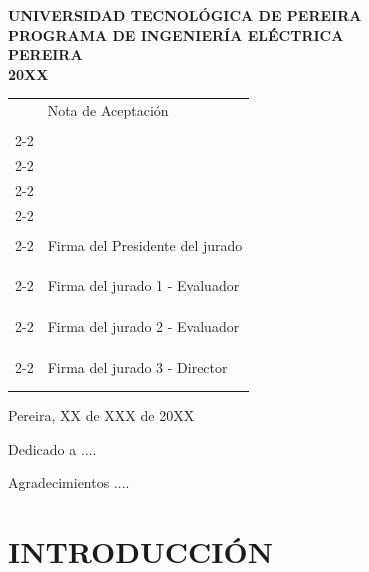 \documentclass[12pt,twoside]{article}
\providecommand{\tabularnewline}{\\}
\let\stdsection\section
\renewcommand\section{\cleardoublepage\stdsection}
\begin{document}
\noindent \begin{center}
\textbf{UNIVERSIDAD TECNOLÓGICA DE PEREIRA\\PROGRAMA DE INGENIERÍA
ELÉCTRICA\\PEREIRA\\20XX}
\par\end{center}

\noindent \begin{center}
\cleardoublepage{}
\par\end{center}

\noindent \begin{flushright}
\begin{tabular}{c>{\centering}p{}}
 & Nota de Aceptación\tabularnewline
 & \tabularnewline
\cline{2-2} 
 & \tabularnewline
\cline{2-2} 
 & \tabularnewline
\cline{2-2} 
 & \tabularnewline
\cline{2-2} 
 & \tabularnewline
 & \tabularnewline
\cline{2-2} 
 & Firma del Presidente del jurado\tabularnewline
 & \tabularnewline
 & \tabularnewline
 & \tabularnewline
\cline{2-2} 
 & Firma del jurado 1 - Evaluador\tabularnewline
 & \tabularnewline
 & \tabularnewline
 & \tabularnewline
\cline{2-2} 
 & Firma del jurado 2 - Evaluador\tabularnewline
 & \tabularnewline
 & \tabularnewline
 & \tabularnewline
\cline{2-2} 
 & Firma del jurado 3 - Director\tabularnewline
 & \tabularnewline
 & \tabularnewline
\end{tabular}
\par\end{flushright}

Pereira, XX de XXX de 20XX

\cleardoublepage{}

Dedicado a ....

\cleardoublepage{}Agradecimientos .... 

\cleardoublepage{}

\tableofcontents{}\listoftables
\listoffigures



\section{\label{sec:introduccion}INTRODUCCIÓN}

\setcounter{page}{11}

\lipsum[1-5]
\end{document}
